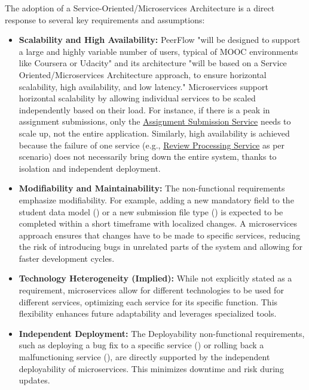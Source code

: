\begin{justify}
    The adoption of a Service-Oriented/Microservices Architecture is a direct response to several key requirements and assumptions:
\end{justify}
\begin{itemize}
    \item \textbf{Scalability and High Availability:} PeerFlow "will be designed to support a large and highly variable number of users, typical of MOOC environments like Coursera or Udacity" and its architecture "will be based on a Service Oriented/Microservices Architecture approach, to ensure horizontal scalability, high availability, and low latency." Microservices support horizontal scalability by allowing individual services to be scaled independently based on their load. For instance, if there is a peak in assignment submissions, only the \hyperref[def:AssignmentSubmissionService]{Assignment Submission Service} needs to scale up, not the entire application. Similarly, high availability is achieved because the failure of one service (e.g., \hyperref[def:ReviewProcessingService]{Review Processing Service} as per  scenario) does not necessarily bring down the entire system, thanks to isolation and independent deployment.
    \item \textbf{Modifiability and Maintainability:} The non-functional requirements emphasize modifiability. For example, adding a new mandatory field to the student data model () or a new submission file type () is expected to be completed within a short timeframe with localized changes. A microservices approach ensures that changes have to be made to specific services, reducing the risk of introducing bugs in unrelated parts of the system and allowing for faster development cycles.
    \item \textbf{Technology Heterogeneity (Implied):} While not explicitly stated as a requirement, microservices allow for different technologies to be used for different services, optimizing each service for its specific function. This flexibility enhances future adaptability and leverages specialized tools.
    \item \textbf{Independent Deployment:} The Deployability non-functional requirements, such as deploying a bug fix to a specific service () or rolling back a malfunctioning service (), are directly supported by the independent deployability of microservices. This minimizes downtime and risk during updates.
\end{itemize}

